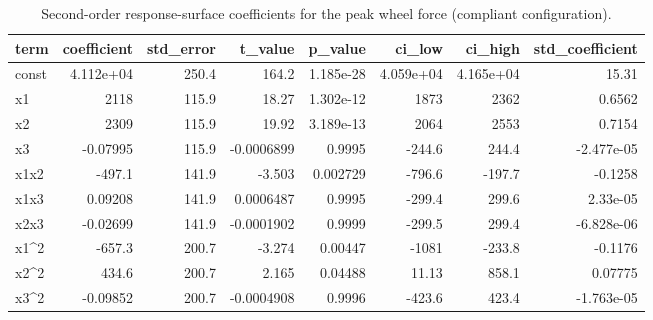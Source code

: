 \begin{table}
\caption{Second-order response-surface coefficients for the peak wheel force (compliant configuration).}
\label{tab:table07_coefficients_force}
\begin{tabular}{lrrrrrrr}
\toprule
term & coefficient & std\_error & t\_value & p\_value & ci\_low & ci\_high & std\_coefficient \\
\midrule
const & 4.112e+04 & 250.4 & 164.2 & 1.185e-28 & 4.059e+04 & 4.165e+04 & 15.31 \\
x1 & 2118 & 115.9 & 18.27 & 1.302e-12 & 1873 & 2362 & 0.6562 \\
x2 & 2309 & 115.9 & 19.92 & 3.189e-13 & 2064 & 2553 & 0.7154 \\
x3 & -0.07995 & 115.9 & -0.0006899 & 0.9995 & -244.6 & 244.4 & -2.477e-05 \\
x1x2 & -497.1 & 141.9 & -3.503 & 0.002729 & -796.6 & -197.7 & -0.1258 \\
x1x3 & 0.09208 & 141.9 & 0.0006487 & 0.9995 & -299.4 & 299.6 & 2.33e-05 \\
x2x3 & -0.02699 & 141.9 & -0.0001902 & 0.9999 & -299.5 & 299.4 & -6.828e-06 \\
x1\textasciicircum 2 & -657.3 & 200.7 & -3.274 & 0.00447 & -1081 & -233.8 & -0.1176 \\
x2\textasciicircum 2 & 434.6 & 200.7 & 2.165 & 0.04488 & 11.13 & 858.1 & 0.07775 \\
x3\textasciicircum 2 & -0.09852 & 200.7 & -0.0004908 & 0.9996 & -423.6 & 423.4 & -1.763e-05 \\
\bottomrule
\end{tabular}
\end{table}
